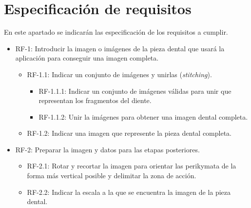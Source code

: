 \section{Especificación de requisitos}

En este apartado se indicarán las especificación de los requisitos a cumplir.

\begin{itemize}
        \item RF-1: Introducir la imagen o imágenes de la pieza dental que usará la aplicación para conseguir una imagen completa.
            \begin{itemize}
                \item RF-1.1: Indicar un conjunto de imágenes y unirlas (\textit{stitching}).
                    \begin{itemize}
                        \item RF-1.1.1: Indicar un conjunto de imágenes válidas para unir que representan los fragmentos del diente.
                        \item RF-1.1.2: Unir la imágenes para obtener una imagen dental completa.
                    \end{itemize}
                \item RF-1.2: Indicar una imagen que represente la pieza dental completa.
            \end{itemize}              
                      
        \item RF-2: Preparar la imagen y datos para las etapas posteriores.
            \begin{itemize}
                \item RF-2.1: Rotar y recortar la imagen para orientar las perikymata de la forma más vertical posible y delimitar la zona de acción.
                \item RF-2.2: Indicar la escala a la que se encuentra la imagen de la pieza dental.      
            \end{itemize}
        

\end{itemize}
